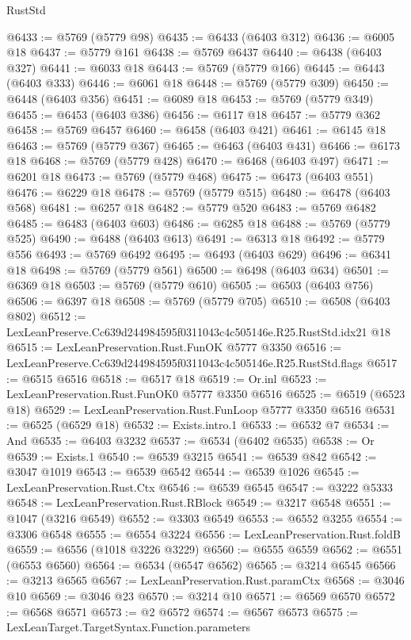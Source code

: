 \begin{lexlean}{RustStd}
\begin{coremodule}
@6433 := @5769 (@5779 @98)
@6435 := @6433 (@6403 @312)
@6436 := @6005 @18
@6437 := @5779 @161
@6438 := @5769 @6437
@6440 := @6438 (@6403 @327)
@6441 := @6033 @18
@6443 := @5769 (@5779 @166)
@6445 := @6443 (@6403 @333)
@6446 := @6061 @18
@6448 := @5769 (@5779 @309)
@6450 := @6448 (@6403 @356)
@6451 := @6089 @18
@6453 := @5769 (@5779 @349)
@6455 := @6453 (@6403 @386)
@6456 := @6117 @18
@6457 := @5779 @362
@6458 := @5769 @6457
@6460 := @6458 (@6403 @421)
@6461 := @6145 @18
@6463 := @5769 (@5779 @367)
@6465 := @6463 (@6403 @431)
@6466 := @6173 @18
@6468 := @5769 (@5779 @428)
@6470 := @6468 (@6403 @497)
@6471 := @6201 @18
@6473 := @5769 (@5779 @468)
@6475 := @6473 (@6403 @551)
@6476 := @6229 @18
@6478 := @5769 (@5779 @515)
@6480 := @6478 (@6403 @568)
@6481 := @6257 @18
@6482 := @5779 @520
@6483 := @5769 @6482
@6485 := @6483 (@6403 @603)
@6486 := @6285 @18
@6488 := @5769 (@5779 @525)
@6490 := @6488 (@6403 @613)
@6491 := @6313 @18
@6492 := @5779 @556
@6493 := @5769 @6492
@6495 := @6493 (@6403 @629)
@6496 := @6341 @18
@6498 := @5769 (@5779 @561)
@6500 := @6498 (@6403 @634)
@6501 := @6369 @18
@6503 := @5769 (@5779 @610)
@6505 := @6503 (@6403 @756)
@6506 := @6397 @18
@6508 := @5769 (@5779 @705)
@6510 := @6508 (@6403 @802)
@6512 := LexLeanPreserve.Cc639d244984595f0311043c4c505146e.R25.RustStd.idx21 @18
@6515 := LexLeanPreservation.Rust.FunOK @5777 @3350
@6516 := LexLeanPreserve.Cc639d244984595f0311043c4c505146e.R25.RustStd.flags
@6517 := @6515 @6516
@6518 := @6517 @18
@6519 := Or.inl
@6523 := LexLeanPreservation.Rust.FunOK0 @5777 @3350 @6516
@6525 := @6519 (@6523 @18)
@6529 := LexLeanPreservation.Rust.FunLoop @5777 @3350 @6516
@6531 := @6525 (@6529 @18)
@6532 := Exists.intro.{1}
@6533 := @6532 @7
@6534 := And
@6535 := @6403 @3232
@6537 := @6534 (@6402 @6535)
@6538 := Or
@6539 := Exists.{1}
@6540 := @6539 @3215
@6541 := @6539 @842
@6542 := @3047 @1019
@6543 := @6539 @6542
@6544 := @6539 @1026
@6545 := LexLeanPreservation.Rust.Ctx
@6546 := @6539 @6545
@6547 := @3222 @5333
@6548 := LexLeanPreservation.Rust.RBlock
@6549 := @3217 @6548
@6551 := @1047 (@3216 @6549)
@6552 := @3303 @6549
@6553 := @6552 @3255
@6554 := @3306 @6548
@6555 := @6554 @3224
@6556 := LexLeanPreservation.Rust.foldB
@6559 := @6556 (@1018 @3226 @3229)
@6560 := @6555 @6559
@6562 := @6551 (@6553 @6560)
@6564 := @6534 (@6547 @6562)
@6565 := @3214 @6545
@6566 := @3213 @6565
@6567 := LexLeanPreservation.Rust.paramCtx
@6568 := @3046 @10
@6569 := @3046 @23
@6570 := @3214 @10
@6571 := @6569 @6570
@6572 := @6568 @6571
@6573 := @2 @6572
@6574 := @6567 @6573
@6575 := LexLeanTarget.TargetSyntax.Function.parameters

\end{coremodule}
\end{lexlean}
